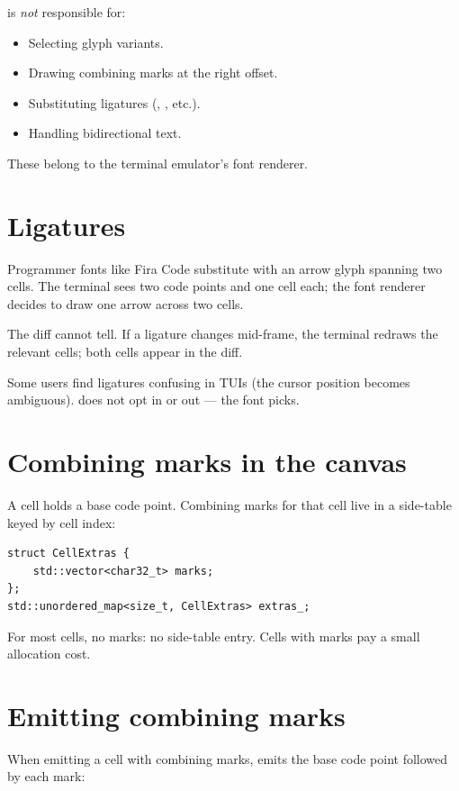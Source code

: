 \maya{} is \emph{not} responsible for:

\begin{itemize}[leftmargin=*]
  \item Selecting glyph variants.
  \item Drawing combining marks at the right offset.
  \item Substituting ligatures (\code{->}, \code{!=}, etc.).
  \item Handling bidirectional text.
\end{itemize}

These belong to the terminal emulator's font renderer.

\section{Ligatures}

Programmer fonts like Fira Code substitute \code{->} with an
arrow glyph spanning two cells. The terminal sees two code
points and one cell each; the font renderer decides to draw
one arrow across two cells.

The diff cannot tell. If a ligature changes mid-frame, the
terminal redraws the relevant cells; both cells appear in the
diff.

Some users find ligatures confusing in TUIs (the cursor
position becomes ambiguous). \maya{} does not opt in or out
--- the font picks.

\section{Combining marks in the canvas}

A cell holds a base code point. Combining marks for that cell
live in a side-table keyed by cell index:

\begin{lstlisting}
struct CellExtras {
    std::vector<char32_t> marks;
};
std::unordered_map<size_t, CellExtras> extras_;
\end{lstlisting}

For most cells, no marks: no side-table entry. Cells with
marks pay a small allocation cost.

\section{Emitting combining marks}

When emitting a cell with combining marks, \maya{} emits the
base code point followed by each mark:

